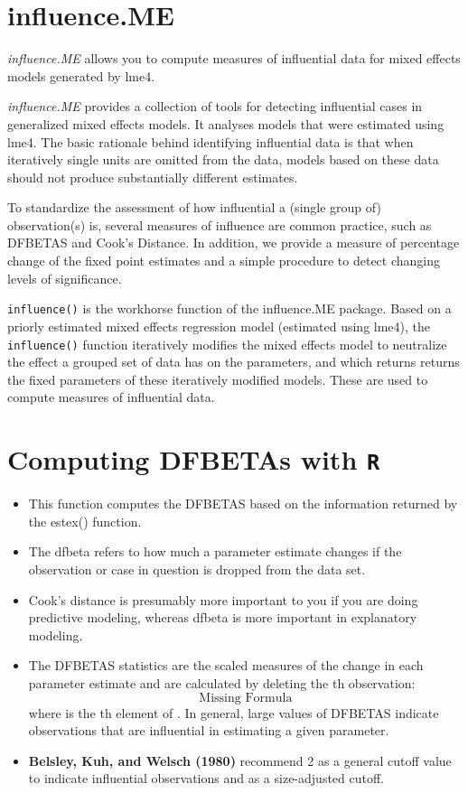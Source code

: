 \documentclass[12pt, a4paper]{report}
\theoremstyle{plain}
\theoremstyle{definition}
\theoremstyle{remark}
\begin{document}
	\section{influence.ME}
	
	\textit{influence.ME} allows you to compute measures of influential data for mixed effects models generated by lme4.
	
	\textit{influence.ME} provides a collection of tools for detecting influential cases in generalized mixed effects models. It analyses models that were estimated using lme4. The basic rationale behind identifying influential data is that when iteratively single units are omitted from the data, models based on these data should not produce substantially different estimates. 
	
	To standardize the assessment of how influential a (single group of) observation(s) is, several measures of influence are common practice, such as DFBETAS and Cook's Distance. In addition, we provide a measure of percentage change of the fixed point estimates and a simple procedure to detect changing levels of significance.
	
	\texttt{influence()} is the workhorse function of the influence.ME package. Based on a priorly estimated mixed effects regression model (estimated using lme4), the \texttt{influence()} function iteratively modifies the mixed effects model to neutralize the effect a grouped set of data has on the parameters, and which returns returns the fixed parameters of these iteratively modified models. These are used to compute measures of influential data.
	
	
	
	
	\section{Computing DFBETAs with \texttt{R}}
	
	\begin{itemize}
		\item This function computes the DFBETAS based on the information returned by the estex() function.
		\item The dfbeta refers to how much a parameter estimate changes if the observation or case in question is dropped from the data set.  
		\item Cook's distance is presumably more important to you if you are doing predictive modeling, whereas dfbeta is more important in explanatory modeling.
		
		\item The DFBETAS statistics are the scaled measures of the change in each parameter estimate and are calculated by deleting the th observation:
		\[ \mbox{Missing Formula}\]
		where  is the th element of .
		In general, large values of DFBETAS indicate observations that are influential in estimating a given parameter. \item \textbf{Belsley, Kuh, and Welsch (1980)} recommend 2 as a general cutoff value to indicate influential observations and  as a size-adjusted cutoff.
	\end{itemize}
	
\end{document}
